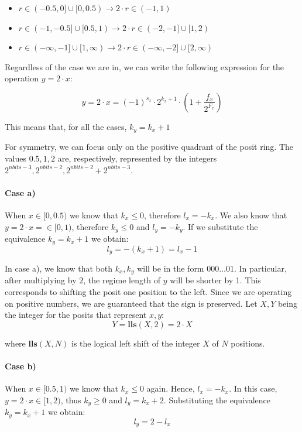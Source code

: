 \begin{itemize}
    \item[a)] $r \in (-0.5,0] \cup [0,0.5) \xrightarrow{} 2\cdot r \in (-1,1)$
    \item[b)] $r \in (-1,-0.5] \cup [0.5,1) \xrightarrow{} 2\cdot r \in (-2,-1] \cup [1,2) $
    \item[c)] $r \in (-\infty, -1] \cup [1, \infty)  \xrightarrow{} 2\cdot r \in (-\infty, -2] \cup [2, \infty)$
\end{itemize}

Regardless of the case we are in, we can write the following expression for the operation $y = 2 \cdot x$:

\begin{equation}
    y = 2 \cdot x = (-1)^{s_x} \cdot 2^{k_x + 1} \cdot \left(1 + \frac{f_x}{2^{F_x}} \right) 
\end{equation}

This means that, for all the cases, $k_y = k_x + 1$

For symmetry, we can focus only on the positive quadrant of the posit ring. The values $0.5,1,2$ are, respectively, represented by the integers $2^{nbits - 3}, 2^{nbits - 2}, 2^{nbits - 2} + 2^{nbits - 3}$.

\paragraph{Case a)} When $x \in [0,0.5)$ we know that $k_x \leq 0$, therefore $l_x = -k_x$. We also know that $y = 2\cdot x = \in [0,1)$, therefore $k_y \leq 0$ and $l_y = -k_y$. If we substitute the equivalence  $k_y = k_x + 1$ we obtain:
\begin{equation}
    l_y = - (k_x + 1) = l_x - 1
\end{equation}


In case a), we know that both $k_x, k_y$ will be in the form $000 \dots 01$. In particular, after multiplying by $2$, the regime length of $y$ will be shorter by 1. This corresponds to shifting the posit one position to the left. Since we are operating on positive numbers, we are guaranteed that the sign is preserved. Let $X,Y$ being the integer for the posits that represent $x,y$:
\begin{equation}
    Y = \mathbf{lls} (X,2) = 2 \cdot X
\end{equation}

where $\mathbf{lls}(X,N)$ is the logical left shift of the integer $X$ of $N$ positions.

\paragraph{Case b)} When $x \in [0.5,1)$ we know that $k_x \leq 0$ again. Hence, $l_x = -k_x$. In this case, $y = 2\cdot x \in [1,2)$, thus $k_y \geq 0$ and $l_y = k_x + 2$. Substituting the equivalence $k_y = k_x + 1$ we obtain:
\begin{equation}
    l_y = 2 - l_x
\end{equation}

